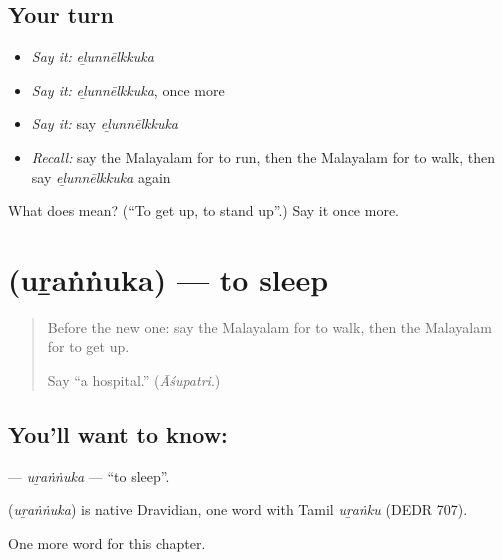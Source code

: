 \subsection*{Your turn}
\begin{itemize}
\raggedright
  \item \emph{Say it:} \emph{eḻunnēlkkuka}
  \item \emph{Say it:} \emph{eḻunnēlkkuka}, once more
  \item \emph{Say it:} say \emph{eḻunnēlkkuka}
  \item \emph{Recall:} say the Malayalam for to run, then the Malayalam for to walk, then say \emph{eḻunnēlkkuka} again
\end{itemize}

\begin{tcolorbox}[breakable,colback=teal!4,colframe=teal!35!black,title={Before you move on}]
What does  mean? (\textquotedblleft{}To get up, to stand up\textquotedblright{}.) Say it once more.
\end{tcolorbox}
\section[\texorpdfstring{\ml{ഉറങ്ങുക} (uṟaṅṅuka)}{ഉറങ്ങുക (uṟaṅṅuka)}]{ (uṟaṅṅuka) — to sleep}

\label{lesson:ML-C171-urannuka}



\begin{quote}
Before the new one: say the Malayalam for to walk, then the Malayalam for to get up.

Say \textquotedblleft{}a hospital.\textquotedblright{} (\emph{Āśupatri}.)
\end{quote}

\subsection*{You'll want to know: }
\textbf{} — \emph{uṟaṅṅuka} — \textquotedblleft{}to sleep\textquotedblright{}.

\begin{cousinweb}
\textbf{} (\emph{uṟaṅṅuka}) is native Dravidian, one word with Tamil \emph{uṟaṅku} (DEDR 707).
\end{cousinweb}

\begin{grammarlens}[title={What you've built}]
One more word for this chapter.
\end{grammarlens}


